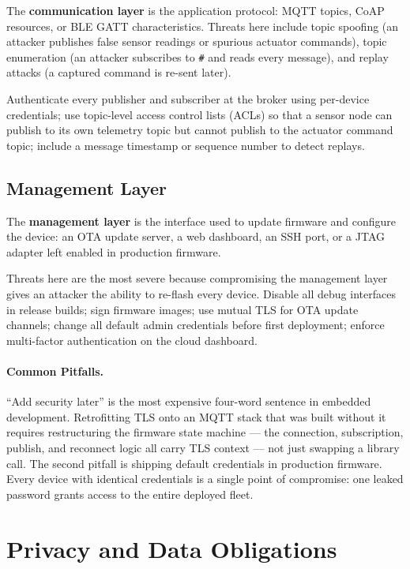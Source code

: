 The \textbf{communication layer} is the application
protocol: MQTT topics, CoAP resources, or BLE GATT characteristics.
Threats here include topic spoofing (an attacker publishes false sensor readings or
spurious actuator commands), topic enumeration (an attacker subscribes to
\texttt{\#} and reads every message), and replay attacks (a captured command is
re-sent later).

Authenticate every publisher and subscriber at the broker using per-device
credentials; use topic-level access control lists (ACLs) so that a sensor node can
publish to its own telemetry topic but cannot publish to the actuator command topic;
include a message timestamp or sequence number to detect replays.

\subsection{Management Layer}
\label{sec:ch9-attack-management}

The \textbf{management layer} is the interface used to
update firmware and configure the device: an OTA update server, a web dashboard,
an SSH port, or a JTAG adapter left enabled in production firmware.

Threats here are the most severe because compromising the management layer gives
an attacker the ability to re-flash every device.
Disable all debug interfaces in release builds; sign firmware images; use
mutual TLS for OTA update channels; change all default admin credentials before
first deployment; enforce multi-factor authentication on the cloud dashboard.

\paragraph{Common Pitfalls.}
``Add security later'' is the most expensive four-word sentence in embedded
development.
Retrofitting TLS onto an MQTT stack that was built without it requires restructuring
the firmware state machine --- the connection, subscription, publish, and reconnect
logic all carry TLS context --- not just swapping a library call.
The second pitfall is shipping default credentials in production firmware.
Every device with identical credentials is a single point of compromise: one
leaked password grants access to the entire deployed fleet.

\section{Privacy and Data Obligations}
\label{sec:ch9-privacy}

